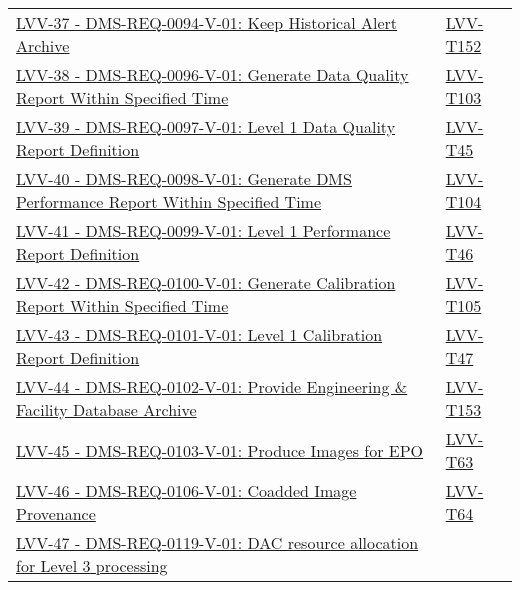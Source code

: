 \begin{longtable}[]{p{13cm}p{3cm}}
\href{https://jira.lsstcorp.org/browse/LVV-37}{LVV-37 -
DMS-REQ-0094-V-01: Keep Historical Alert Archive} &
\protect\hyperlink{lvv-t152---verify-implementation-of-keep-historical-alert-archive-dms-req-0094}{LVV-T152}\tabularnewline
\href{https://jira.lsstcorp.org/browse/LVV-38}{LVV-38 -
DMS-REQ-0096-V-01: Generate Data Quality Report Within Specified Time} &
\protect\hyperlink{lvv-t103---verify-implementation-of-generate-data-quality-report-within-specified-time-dms-req-0096}{LVV-T103}\tabularnewline
\href{https://jira.lsstcorp.org/browse/LVV-39}{LVV-39 -
DMS-REQ-0097-V-01: Level 1 Data Quality Report Definition} &
\protect\hyperlink{lvv-t45---verify-implementation-of-level-1-data-quality-report-definition-dms-req-0097}{LVV-T45}\tabularnewline
\href{https://jira.lsstcorp.org/browse/LVV-40}{LVV-40 -
DMS-REQ-0098-V-01: Generate DMS Performance Report Within Specified
Time} &
\protect\hyperlink{lvv-t104---verify-implementation-of-generate-dms-performance-report-within-specified-time-dms-req-0098}{LVV-T104}\tabularnewline
\href{https://jira.lsstcorp.org/browse/LVV-41}{LVV-41 -
DMS-REQ-0099-V-01: Level 1 Performance Report Definition} &
\protect\hyperlink{lvv-t46---verify-implementation-of-level-1-performance-report-definition-dms-req-0099}{LVV-T46}\tabularnewline
\href{https://jira.lsstcorp.org/browse/LVV-42}{LVV-42 -
DMS-REQ-0100-V-01: Generate Calibration Report Within Specified Time} &
\protect\hyperlink{lvv-t105---verify-implementation-of-generate-calibration-report-within-specified-time-dms-req-0100}{LVV-T105}\tabularnewline
\href{https://jira.lsstcorp.org/browse/LVV-43}{LVV-43 -
DMS-REQ-0101-V-01: Level 1 Calibration Report Definition} &
\protect\hyperlink{lvv-t47---verify--implementation-of-level-1-calibration-report-definition-dms-req-0101}{LVV-T47}\tabularnewline
\href{https://jira.lsstcorp.org/browse/LVV-44}{LVV-44 -
DMS-REQ-0102-V-01: Provide Engineering \& Facility Database Archive} &
\protect\hyperlink{lvv-t153---verify-implementation-of-provide-engineering-and-facility-database-archive-dms-req-0102}{LVV-T153}\tabularnewline
\href{https://jira.lsstcorp.org/browse/LVV-45}{LVV-45 -
DMS-REQ-0103-V-01: Produce Images for EPO} &
\protect\hyperlink{lvv-t63---verify-implementation-of-produce-images-for-epo-dms-req-0103}{LVV-T63}\tabularnewline
\href{https://jira.lsstcorp.org/browse/LVV-46}{LVV-46 -
DMS-REQ-0106-V-01: Coadded Image Provenance} &
\protect\hyperlink{lvv-t64---verify-implementation-of-coadded-image-provenance-dms-req-0106}{LVV-T64}\tabularnewline
\href{https://jira.lsstcorp.org/browse/LVV-47}{LVV-47 -
DMS-REQ-0119-V-01: DAC resource allocation for Level 3 processing} &

\end{longtable}
